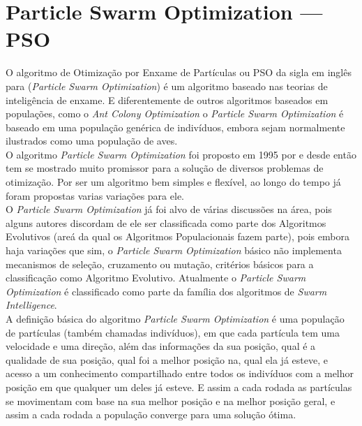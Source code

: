 \section{Particle Swarm Optimization — PSO}
        O algoritmo de Otimização por Enxame de Partículas ou PSO da sigla em inglês para (\textit{Particle Swarm Optimization}) é um algoritmo baseado nas teorias de inteligência de enxame. E diferentemente de outros algoritmos baseados em populações, como o \textit{Ant Colony Optimization} o \textit{Particle Swarm Optimization} é baseado em uma população genérica de indivíduos, embora sejam normalmente ilustrados como uma população de aves.\\


        O algoritmo \textit{Particle Swarm Optimization} foi proposto em 1995 por \cite{Kennedy1995} e desde então tem se mostrado muito promissor para a solução de diversos problemas de otimização. Por ser um algoritmo bem simples e flexível, ao longo do tempo já foram propostas varias variações para ele.\\
        O \textit{Particle Swarm Optimization} já foi alvo de várias discussões na área, pois alguns autores discordam de ele ser classificada como parte dos Algoritmos Evolutivos (areá da qual os Algoritmos Populacionais fazem parte), pois embora haja variações que sim, o \textit{Particle Swarm Optimization} básico não implementa mecanismos de seleção, cruzamento ou mutação, critérios básicos para a classificação como Algoritmo Evolutivo.
        Atualmente o \textit{Particle Swarm Optimization} é classificado como parte da família dos algoritmos de \textit{Swarm Intelligence}.\\


        A definição básica do algoritmo \textit{Particle Swarm Optimization} é uma população de partículas (também chamadas indivíduos), em que cada partícula tem uma velocidade e uma direção, além das informações da sua posição, qual é a qualidade de sua posição, qual foi a melhor posição na, qual ela já esteve, e acesso a um conhecimento compartilhado entre todos os indivíduos com a melhor posição em que qualquer um deles já esteve. E assim a cada rodada as partículas se movimentam com base na sua melhor posição e na melhor posição geral, e assim a cada rodada a população converge para uma solução ótima.\\
        
